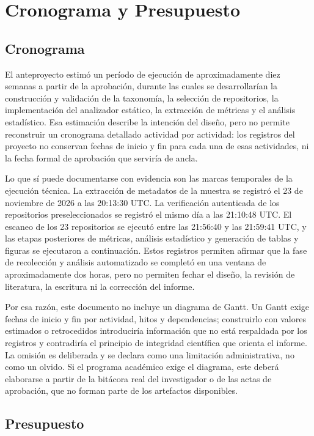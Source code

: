 \section{Cronograma y Presupuesto}\label{sec:cronograma}

\subsection{Cronograma}

El anteproyecto estimó un período de ejecución de aproximadamente diez semanas a partir de la aprobación, durante las cuales se desarrollarían la construcción y validación de la taxonomía, la selección de repositorios, la implementación del analizador estático, la extracción de métricas y el análisis estadístico. Esa estimación describe la intención del diseño, pero no permite reconstruir un cronograma detallado actividad por actividad: los registros del proyecto no conservan fechas de inicio y fin para cada una de esas actividades, ni la fecha formal de aprobación que serviría de ancla.

Lo que sí puede documentarse con evidencia son las marcas temporales de la ejecución técnica. La extracción de metadatos de la muestra se registró el 23 de noviembre de 2026 a las 20:13:30 UTC. La verificación autenticada de los repositorios preseleccionados se registró el mismo día a las 21:10:48 UTC. El escaneo de los 23 repositorios se ejecutó entre las 21:56:40 y las 21:59:41 UTC, y las etapas posteriores de métricas, análisis estadístico y generación de tablas y figuras se ejecutaron a continuación. Estos registros permiten afirmar que la fase de recolección y análisis automatizado se completó en una ventana de aproximadamente dos horas, pero no permiten fechar el diseño, la revisión de literatura, la escritura ni la corrección del informe.

Por esa razón, este documento no incluye un diagrama de Gantt. Un Gantt exige fechas de inicio y fin por actividad, hitos y dependencias; construirlo con valores estimados o retrocedidos introduciría información que no está respaldada por los registros y contradiría el principio de integridad científica que orienta el informe. La omisión es deliberada y se declara como una limitación administrativa, no como un olvido. Si el programa académico exige el diagrama, este deberá elaborarse a partir de la bitácora real del investigador o de las actas de aprobación, que no forman parte de los artefactos disponibles.

\subsection{Presupuesto}

